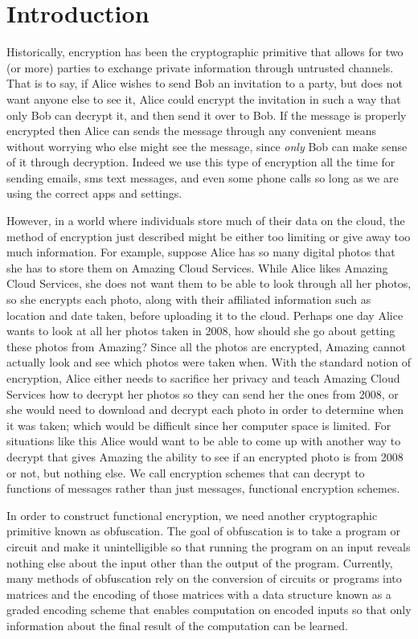 \documentclass[12pt,twoside]{reedthesis}
\begin{document}
     \chapter*{Introduction}
	        Historically, encryption has been the cryptographic primitive that allows for two (or more) parties to exchange private information through untrusted channels. That is to say, if Alice wishes to send Bob an invitation to a party, but does not want anyone else to see it, Alice could encrypt the invitation in such a way that only Bob can decrypt it, and then send it over to Bob. If the message is properly encrypted then Alice can sends the message through any convenient means without worrying who else might see the message, since \textit{only} Bob can make sense of it through decryption. Indeed we use this type of encryption all the time for sending emails, sms text messages, and even some phone calls so long as we are using the correct apps and settings.
	        \par However, in a world where individuals store much of their data on the cloud, the method of encryption just described might be either too limiting or give away too much information. For example, suppose Alice has so many digital photos that she has to store them on Amazing Cloud Services. While Alice likes Amazing Cloud Services, she does not want them to be able to look through all her photos, so she encrypts each photo, along with their affiliated information such as location and date taken, before uploading it to the cloud. Perhaps one day Alice wants to look at all her photos taken in 2008, how should she go about getting these photos from Amazing? Since all the photos are encrypted, Amazing cannot actually look and see which photos were taken when. With the standard notion of encryption, Alice either needs to sacrifice her privacy and teach Amazing Cloud Services how to decrypt her photos so they can send her the ones from 2008, or she would need to download and decrypt each photo in order to determine when it was taken; which would be difficult since her computer space is limited. For situations like this Alice would want to be able to come up with another way to decrypt that gives Amazing the ability to see if an encrypted photo is from 2008 or not, but nothing else. We call encryption schemes that can decrypt to functions of messages rather than just messages, functional encryption schemes.
	        \par In order to construct functional encryption, we need another cryptographic primitive known as obfuscation. The goal of obfuscation is to take a program or circuit and make it unintelligible so that running the program on an input reveals nothing else about the input other than the output of the program. Currently, many methods of obfuscation rely on the conversion of circuits or programs into matrices and the encoding of those matrices with a data structure known as a graded encoding scheme that enables computation on encoded inputs so that only information about the final result of the computation can be learned.
\end{document}
